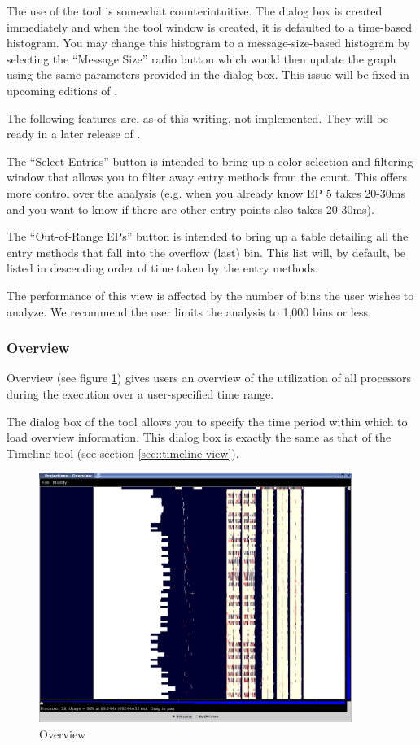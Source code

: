 \documentclass[10pt]{article}
\begin{document}
The use of the tool is somewhat counterintuitive. The dialog box is
created immediately and when the tool window is created, it is
defaulted to a time-based histogram. You may change this histogram to
a message-size-based histogram by selecting the ``Message Size'' radio
button which would then update the graph using the same parameters
provided in the dialog box. This issue will be fixed in upcoming
editions of \projections{}.

The following features are, as of this writing, not implemented. They
will be ready in a later release of \projections{}.

The ``Select Entries'' button is intended to bring up a color
selection and filtering window that allows you to filter away entry
methods from the count. This offers more control over the analysis
(e.g. when you already know EP 5 takes 20-30ms and you want to know if
there are other entry points also takes 20-30ms).

The ``Out-of-Range EPs'' button is intended to bring up a table
detailing all the entry methods that fall into the overflow (last)
bin. This list will, by default, be listed in descending order of time
taken by the entry methods.

The performance of this view is affected by the number of bins the
user wishes to analyze. We recommend the user limits the analysis to
1,000 bins or less.

\subsubsection{Overview}

Overview (see figure \ref{overview}) gives users an overview of the
utilization of all processors during the execution over a
user-specified time range.

The dialog box of the tool allows you to specify the time period
within which to load overview information. This dialog box is exactly
the same as that of the Timeline tool (see section \ref{sec::timeline
view}).

\begin{figure}[htb]
\center
\includegraphics[width=4.0in]{fig/overview}
\caption{Overview}
\label{overview}
\end{figure}
\end{document}
